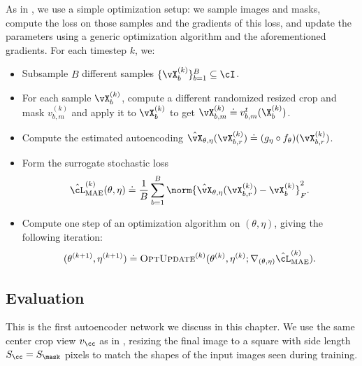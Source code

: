 \documentclass[../../book-main.tex]{subfiles}
\begin{document}
As in , we use a simple optimization setup: we sample images and masks, compute the loss on those samples and the gradients of this loss, and update the parameters using a generic optimization algorithm and the aforementioned gradients. For each timestep \(k\), we:
\begin{itemize}
    \item Subsample \(B\) different samples \(\{\vX_{b}^{(k)}\}_{b = 1}^{B} \subseteq \cI\).
    \item For each sample \(\vX_{b}^{(k)}\), compute a different randomized resized crop and mask \(v_{b, m}^{(k)}\) and apply it to \(\vX_{b}^{(k)}\) to get \(\vX_{b, m}^{(k)} \doteq v_{b, m}^{t}(\X_{b}^{(k)})\).
    \item Compute the estimated autoencoding \(\hat{\vX}_{\theta, \eta}(\vX_{b, r}^{(k)}) \doteq (g_{\eta} \circ f_{\theta})(\vX_{b, r}^{(k)})\).
    \item Form the surrogate stochastic loss 
    \begin{equation}
        \hat{\cL}_{\mathrm{MAE}}^{(k)}(\theta, \eta) \doteq \frac{1}{B}\sum_{b = 1}^{B}\norm{\hat{\vX}_{\theta, \eta}(\vX_{b, r}^{(k)}) - \vX_{b}^{(k)}}_{F}^{2}.
    \end{equation}
    \item Compute one step of an optimization algorithm on \((\theta, \eta)\), giving the following iteration:
    \begin{equation}
        (\theta^{(k + 1)}, \eta^{(k + 1)}) \doteq \textsc{OptUpdate}^{(k)}(\theta^{(k)}, \eta^{(k)}; \nabla_{(\theta, \eta)}\hat{\cL}_{\mathrm{MAE}}^{(k)}).
    \end{equation}
\end{itemize}

\subsection{Evaluation} \label{sub:image_completion_optimization_1}

This is the first autoencoder network we discuss in this chapter. We use the same center crop view \(v_{\cc}\) as in , resizing the final image to a square with side length \(S_{\cc} = S_{\mask}\) pixels to match the shapes of the input images seen during training. 
\end{document}
